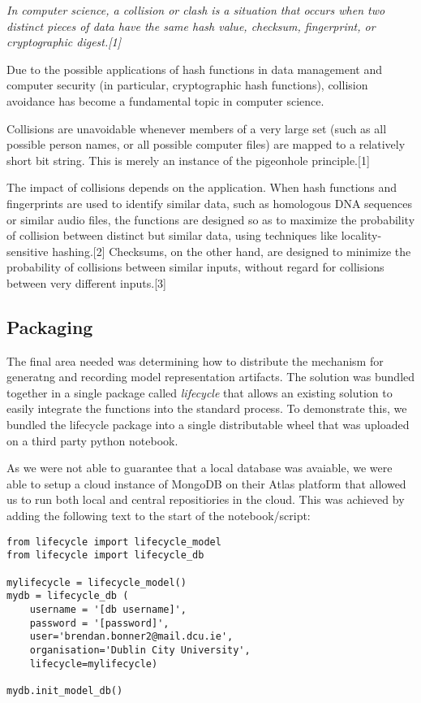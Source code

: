 { \itshape
In computer science, a collision or clash is a situation that occurs when two distinct pieces of data have the same hash value, checksum, fingerprint, or cryptographic digest.[1]

Due to the possible applications of hash functions in data management and computer security (in particular, cryptographic hash functions), collision avoidance has become a fundamental topic in computer science.

Collisions are unavoidable whenever members of a very large set (such as all possible person names, or all possible computer files) are mapped to a relatively short bit string. This is merely an instance of the pigeonhole principle.[1]

The impact of collisions depends on the application. When hash functions and fingerprints are used to identify similar data, such as homologous DNA sequences or similar audio files, the functions are designed so as to maximize the probability of collision between distinct but similar data, using techniques like locality-sensitive hashing.[2] Checksums, on the other hand, are designed to minimize the probability of collisions between similar inputs, without regard for collisions between very different inputs.[3]
}


\subsection{Packaging}

The final area needed was determining how to distribute the mechanism for generatng and recording model representation artifacts. The solution was bundled together in a single package called \textit{lifecycle} that allows an existing solution to easily integrate the functions into the standard process. To demonstrate this, we bundled the lifecycle package into a single distributable wheel that was uploaded on a third party python notebook.

As we were not able to guarantee that a local database was avaiable, we were able to setup a cloud instance of MongoDB on their Atlas platform that allowed us to run both local and central repositiories in the cloud. This was achieved by adding the following text to the start of the notebook/script:

\begin{lstlisting}
from lifecycle import lifecycle_model
from lifecycle import lifecycle_db

mylifecycle = lifecycle_model()
mydb = lifecycle_db (
    username = '[db username]',
    password = '[password]',
    user='brendan.bonner2@mail.dcu.ie',
    organisation='Dublin City University',
    lifecycle=mylifecycle)

mydb.init_model_db()
\end{lstlisting}

